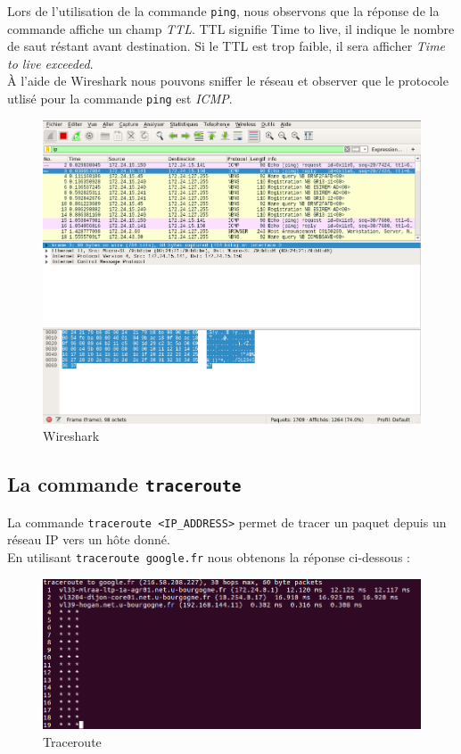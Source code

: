 Lors de l'utilisation de la commande \texttt{ping}, nous observons que la réponse de la commande affiche un champ \textit{TTL}. TTL signifie Time to live, il indique le nombre de saut réstant avant destination. Si le TTL est trop faible, il sera afficher \textit{Time to live exceeded}.\\
À l'aide de Wireshark nous pouvons sniffer le réseau et observer que le protocole utlisé pour la commande \texttt{ping} est \textit{ICMP}.
\begin{figure}[H]
\centering
\includegraphics[width=400pt]{./TP1/Pictures/wireshark}
\caption{Wireshark}
\label{Wireshark}
\end{figure}

\subsection{La commande \texttt{traceroute}}

La commande \texttt{traceroute <IP_ADDRESS>} permet de tracer un paquet depuis un réseau IP vers un hôte donné.\\
En utilisant \texttt{traceroute google.fr} nous obtenons la réponse ci-dessous :

\begin{figure}[H]
\centering
\includegraphics[width=400pt]{./TP1/Pictures/traceroute}
\caption{Traceroute}
\label{Traceroute}
\end{figure}

